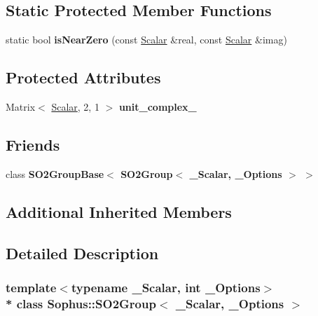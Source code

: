 \subsection*{Static Protected Member Functions}
\begin{DoxyCompactItemize}
\item 
static bool {\bfseries is\+Near\+Zero} (const \hyperlink{class_sophus_1_1_s_o2_group_a752943ea935a3007be93245ddd16bc74}{Scalar} \&real, const \hyperlink{class_sophus_1_1_s_o2_group_a752943ea935a3007be93245ddd16bc74}{Scalar} \&imag)\hypertarget{class_sophus_1_1_s_o2_group_a92e753be12472d183b90e2723b199f3d}{}\label{class_sophus_1_1_s_o2_group_a92e753be12472d183b90e2723b199f3d}

\end{DoxyCompactItemize}
\subsection*{Protected Attributes}
\begin{DoxyCompactItemize}
\item 
Matrix$<$ \hyperlink{class_sophus_1_1_s_o2_group_a752943ea935a3007be93245ddd16bc74}{Scalar}, 2, 1 $>$ {\bfseries unit\+\_\+complex\+\_\+}\hypertarget{class_sophus_1_1_s_o2_group_ae1331f0c0cbe5b89b8ecec59f394204b}{}\label{class_sophus_1_1_s_o2_group_ae1331f0c0cbe5b89b8ecec59f394204b}

\end{DoxyCompactItemize}
\subsection*{Friends}
\begin{DoxyCompactItemize}
\item 
class {\bfseries S\+O2\+Group\+Base$<$ S\+O2\+Group$<$ \+\_\+\+Scalar, \+\_\+\+Options $>$ $>$}\hypertarget{class_sophus_1_1_s_o2_group_a6a116ef1b75da321cdd705e4e3e5e432}{}\label{class_sophus_1_1_s_o2_group_a6a116ef1b75da321cdd705e4e3e5e432}

\end{DoxyCompactItemize}
\subsection*{Additional Inherited Members}


\subsection{Detailed Description}
\subsubsection*{template$<$typename \+\_\+\+Scalar, int \+\_\+\+Options$>$\\*
class Sophus\+::\+S\+O2\+Group$<$ \+\_\+\+Scalar, \+\_\+\+Options $>$}

